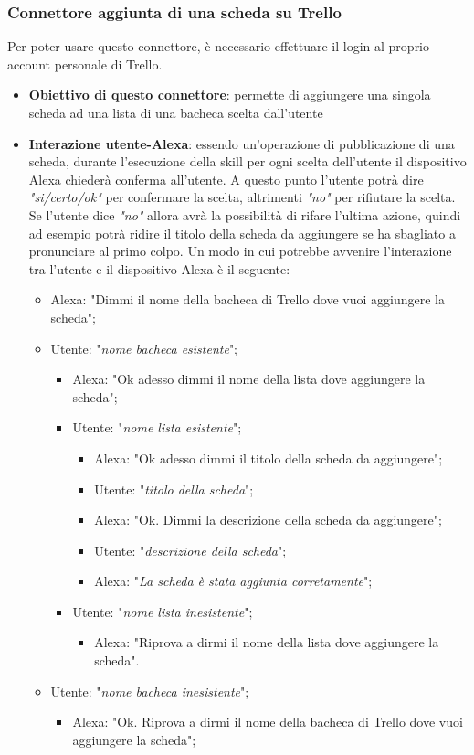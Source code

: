 \subsubsection{Connettore aggiunta di una scheda su Trello}
Per poter usare questo connettore, è necessario effettuare il login al proprio account personale di Trello.
\begin{itemize}
	\item \textbf{Obiettivo di questo connettore}: permette di aggiungere una singola scheda ad una lista di una bacheca scelta dall'utente
	\item \textbf{Interazione utente-Alexa}: essendo un'operazione di pubblicazione di una scheda, durante l'esecuzione della skill per ogni scelta dell'utente il dispositivo Alexa chiederà conferma all'utente. A questo punto l'utente potrà dire {\it "si/certo/ok"} per confermare la scelta, altrimenti {\it "no" } per rifiutare la scelta. Se l'utente dice {\it "no" } allora avrà la possibilità di rifare l'ultima azione, quindi ad esempio potrà ridire il titolo della scheda da aggiungere se ha sbagliato a pronunciare al primo colpo.\newline
	Un modo in cui potrebbe avvenire l'interazione tra l'utente e il dispositivo Alexa è il seguente:
	\begin{itemize}
		\item Alexa: "Dimmi il nome della bacheca di Trello dove vuoi aggiungere la scheda";
		\item Utente: "{\it nome bacheca esistente}";
		\begin{itemize}
			\item Alexa: "Ok adesso dimmi il nome della lista dove aggiungere la scheda";
			\item Utente: "{\it nome lista esistente}";
			\begin{itemize}
				\item Alexa: "Ok adesso dimmi il titolo della scheda da aggiungere";
				\item Utente: "{\it titolo della scheda}";
				\item Alexa: "Ok. Dimmi la descrizione della scheda da aggiungere";
				\item Utente: "{\it descrizione della scheda}";
				\item Alexa: "{\it La scheda è stata aggiunta corretamente}";
			\end{itemize}
			\item Utente: "{\it nome lista inesistente}";
			\begin{itemize}
				\item Alexa: "Riprova a dirmi il nome della lista dove aggiungere la scheda".
			\end{itemize}		
		\end{itemize}
		\item Utente: "{\it nome bacheca inesistente}";
		\begin{itemize}
			\item Alexa: "Ok. Riprova a dirmi il nome della bacheca di Trello dove vuoi aggiungere la scheda";
		\end{itemize}
	\end{itemize}
\end{itemize}



